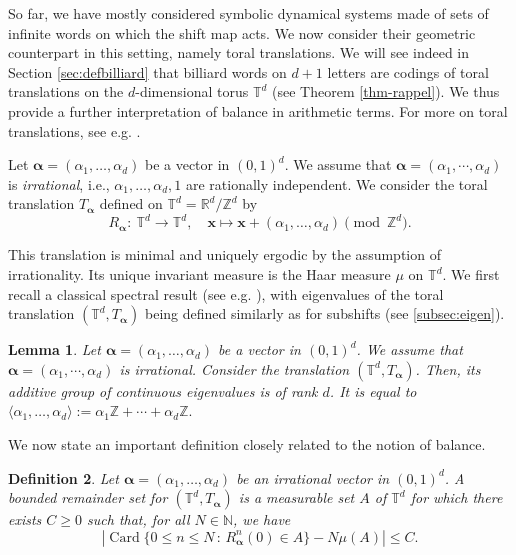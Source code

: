 \documentclass{article}
\newtheorem{lemma}{Lemma}%
\newtheorem{definition}[lemma]{Definition}
\theoremstyle{definition}
\newcommand{\Z}{\mathbb{Z}}
\newcommand{\balpha}{\boldsymbol{\alpha}}
\DeclareMathOperator{\Card}{Card}
\begin{document}
So far, we have mostly  considered  symbolic  dynamical systems made of   sets of infinite words on which the shift map acts.    We now consider  their geometric counterpart in this setting,     namely toral translations. We will  see indeed in  Section \ref{sec:defbilliard} that  billiard words on $d+1$ letters are  codings of toral translations on  the $d$-dimensional torus $\mathbb{T}^{d}$ (see Theorem \ref{thm-rappel}).  We thus  provide  a further interpretation of  balance in arithmetic terms.
For more on toral translations, see e.g.  \cite{Walters}.

Let  $\balpha= (\alpha_1,\dots,\alpha_{d}) $  be  a vector in $(0,1)^d$. We  assume that $\balpha=(\alpha_1, \cdots, \alpha_d)$  is {\em  irrational}, i.e., $ \alpha_1,\dots,\alpha_{d},1$ are rationally independent. 
We consider the   toral translation $T_{\balpha}$   defined on $\mathbb{T}^{d} = \mathbb{R}^{d}/\mathbb{Z}^{d}$ by \[
R_{\balpha}:\  \mathbb{T}^{d} \rightarrow \mathbb{T}^{d}, \quad  {\mathbf x} \mapsto  {\mathbf x}  + (\alpha_1,\dots,\alpha_{d})  \pmod{\mathbb{Z}^{d}}.
\]

This  translation is minimal and uniquely ergodic by the assumption of   irrationality.  Its  unique invariant measure
is the Haar measure $\mu$ on $\mathbb{T}^{d}$. 
We first  recall a classical spectral result (see e.g. \cite{Walters}), with eigenvalues of   the   toral translation $(\mathbb{T}^{d}
,T_{\balpha})$   being  defined similarly as for subshifts (see \cref{subsec:eigen}).
\begin{lemma}\label{rot-eigenvalue}
Let  $\balpha= (\alpha_1,\dots,\alpha_{d}) $  be  a vector in $(0,1)^d$. We  assume that $\balpha=(\alpha_1, \cdots, \alpha_d)$  is {\em  irrational}. Consider the translation  $(\mathbb T^d, T_{\balpha})$. Then, its  additive group   of continuous eigenvalues is of rank $d$. It is equal to
$\langle \alpha_1, \ldots, \alpha_d\rangle:=  \alpha_1\Z+ \cdots+ \alpha_d\Z.$
 \end{lemma}
We now    state an important definition  closely related to the notion of balance.
\begin{definition}
Let $\balpha= (\alpha_1,\dots,\alpha_{d}) $  be  an irrational  vector in $(0,1)^d$.
A bounded remainder set   for $(\mathbb T^d, T_{\balpha})$ is a  measurable set 
$A$  of  $\mathbb T^d$ for which there  exists  $C\geq 0$ such that,  for all $N\in\mathbb N$, we have
$$ | {\Card} \{ 0 \leq n \leq N  \,: \,   R_{\balpha} ^n (0) \in  A \} - N \mu(A) | \leq C.$$
\end{definition}
\end{document}
